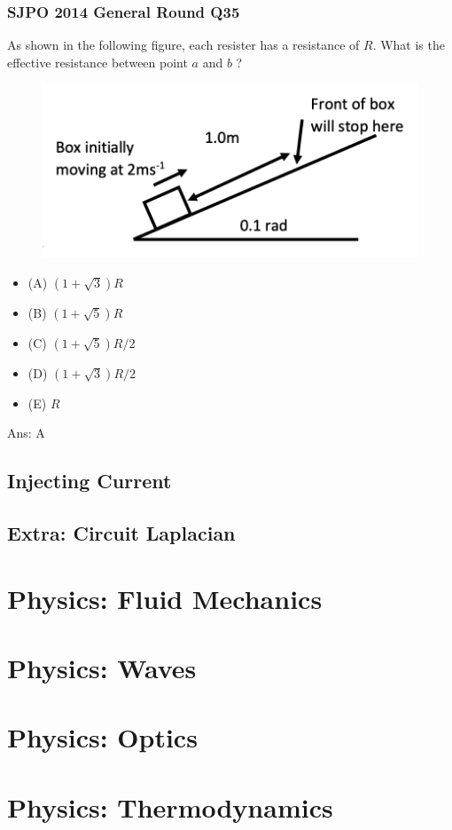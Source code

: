 \documentclass{article}
\begin{document}
\subsubsection{SJPO 2014 General Round Q35}
As shown in the following figure, each resister has a resistance of $R$. What is the effective resistance between point $a$ and $b$ ?
\begin{figure}
\includegraphics[width=1.0\linewidth]{images/sjpo2016q4.png}
\end{figure}
\begin{itemize}
\item[] (A) $(1+\sqrt{3}) R$
\item[] (B) $(1+\sqrt{5}) R$
\item[] (C) $(1+\sqrt{5}) R / 2$
\item[] (D) $(1+\sqrt{3}) R / 2$
\item[] (E) $R$
\end{itemize}
Ans: \ifpaper A \fi 
\subsection{Injecting Current}
\subsection{Extra: Circuit Laplacian}
\section{Physics: Fluid Mechanics}
\section{Physics: Waves}
\section{Physics: Optics}
\section{Physics: Thermodynamics}
\end{document}
